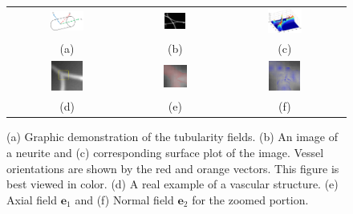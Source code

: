 \begin{figure}[t]
\centering
\begin{tabular}{ccc}
\includegraphics[width=0.3\textwidth]{images/ch2/3dvessel}	&
\includegraphics[width=0.25\textwidth]{images/ch2/vessel}	&
\includegraphics[width=0.3\textwidth]{images/ch2/vessel_mesh} \\
\scriptsize(a) & \scriptsize(b) & \scriptsize(c) \\
\includegraphics[width=0.28\textwidth]{images/ch2/orig}	&
\includegraphics[width=0.28\textwidth]{images/ch2/F1}	&
\includegraphics[width=0.28\textwidth]{images/ch2/F2} \\
\scriptsize(d) & \scriptsize(e) & \scriptsize(f) \\
\end{tabular}
\caption[Tubularity field]{(a) Graphic demonstration of the tubularity fields. (b) An image of a neurite and (c) corresponding surface plot of the image. Vessel orientations are shown by the red and orange vectors. This figure is best viewed in color. (d) A real example of a vascular structure. (e) Axial field $\textbf{e}_1$ and (f) Normal field $\textbf{e}_2$ for the zoomed portion.}
\label{fig:frangi_vessel}
\end{figure}

